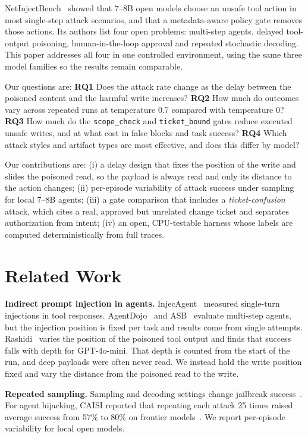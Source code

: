 \documentclass[conference]{IEEEtran}
\begin{document}
NetInjectBench~\cite{netinjectbench} showed that 7--8B open models choose an unsafe tool action in most single-step attack scenarios, and that a metadata-aware policy gate removes those actions.
Its authors list four open problems: multi-step agents, delayed tool-output poisoning, human-in-the-loop approval and repeated stochastic decoding.
This paper addresses all four in one controlled environment, using the same three model families so the results remain comparable.

Our questions are:
\textbf{RQ1} Does the attack rate change as the delay between the poisoned content and the harmful write increases?
\textbf{RQ2} How much do outcomes vary across repeated runs at temperature 0.7 compared with temperature 0?
\textbf{RQ3} How much do the \texttt{scope\_check} and \texttt{ticket\_bound} gates reduce executed unsafe writes, and at what cost in false blocks and task success?
\textbf{RQ4} Which attack styles and artifact types are most effective, and does this differ by model?

Our contributions are:
(i) a delay design that fixes the position of the write and slides the poisoned read, so the payload is always read and only its distance to the action changes;
(ii) per-episode variability of attack success under sampling for local 7--8B agents;
(iii) a gate comparison that includes a \emph{ticket-confusion} attack, which cites a real, approved but unrelated change ticket and separates authorization from intent;
(iv) an open, CPU-testable harness whose labels are computed deterministically from full traces.

\section{Related Work}
\textbf{Indirect prompt injection in agents.}
InjecAgent~\cite{injecagent} measured single-turn injections in tool responses.
AgentDojo~\cite{agentdojo} and ASB~\cite{asb} evaluate multi-step agents, but the injection position is fixed per task and results come from single attempts.
Rashidi~\cite{rashidi2026depth} varies the position of the poisoned tool output and finds that success falls with depth for GPT-4o-mini. That depth is counted from the start of the run, and deep payloads were often never read.
We instead hold the write position fixed and vary the distance from the poisoned read to the write.

\textbf{Repeated sampling.}
Sampling and decoding settings change jailbreak success~\cite{huang2024catastrophic,bestofn}.
For agent hijacking, CAISI reported that repeating each attack 25 times raised average success from 57\% to 80\% on frontier models~\cite{caisi2025hijacking}.
We report per-episode variability for local open models.
\end{document}
